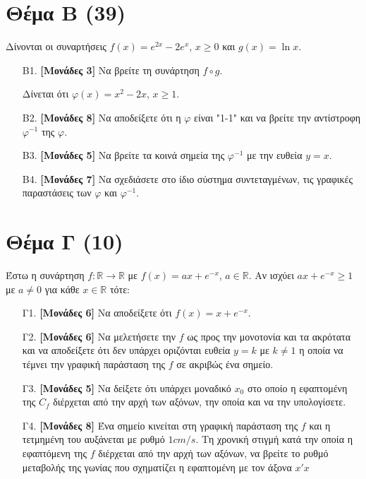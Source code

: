 \documentclass[14pt]{extarticle}
\begin{document}
\section*{Θέμα Β (39)}
Δίνονται οι συναρτήσεις $f(x)=e^{2x}-2e^{x}$, $x\ge 0$ και $g(x)=\ln x$.
\begin{enumerate}
 \item[Β1.] \textbf{[Μονάδες 3]} Να βρείτε τη συνάρτηση $f\circ g$.
       
       Δίνεται ότι $φ(x)=x^2-2x$, $x\ge 1$.
       
 \item[Β2.] \textbf{[Μονάδες 8]} Να αποδείξετε ότι η $φ$ είναι "1-1" και να βρείτε την αντίστροφη $φ^{-1}$ της $φ$.
 \item[Β3.] \textbf{[Μονάδες 5]} Να βρείτε τα κοινά σημεία της $φ^{-1}$ με την ευθεία $y=x$.
 \item[Β4.] \textbf{[Μονάδες 7]} Να σχεδιάσετε στο ίδιο σύστημα συντεταγμένων, τις γραφικές παραστάσεις των $φ$ και $φ^{-1}$.
\end{enumerate}

\section*{Θέμα Γ (10)}
Έστω η συνάρτηση $f:\mathbb{R}\to\mathbb{R}$ με $f(x)= ax+e^{-x}$, $a\in\mathbb{R}$. Αν ισχύει $ax+e^{-x}\ge 1$ με $a\ne 0$ για κάθε $x\in\mathbb{R}$ τότε:
\begin{enumerate}
 \item[Γ1.] \textbf{[Μονάδες 6]} Να αποδείξετε ότι $f(x)=x+e^{-x}$.
 \item[Γ2.] \textbf{[Μονάδες 6]} Να μελετήσετε την $f$ ως προς την μονοτονία και τα ακρότατα και να αποδείξετε ότι δεν υπάρχει οριζόνται ευθεία $y=k$ με $k\ne 1$ η οποία να τέμνει την γραφική παράσταση της $f$ σε ακριβώς ένα σημείο.
 \item[Γ3.] \textbf{[Μονάδες 5]} Να δείξετε ότι υπάρχει μοναδικό $x_0$ στο οποίο η εφαπτομένη της $C_f$ διέρχεται από την αρχή των αξόνων, την οποία και να την υπολογίσετε.
 \item[Γ4.] \textbf{[Μονάδες 8]} Ένα σημείο κινείται στη γραφική παράσταση της $f$ και η τετμημένη του αυξάνεται με ρυθμό $1 cm/s$. Τη χρονική στιγμή κατά την οποία η εφαπτόμενη της $f$ διέρχεται από την αρχή των αξόνων, να βρείτε το ρυθμό μεταβολής της γωνίας που σχηματίζει η εφαπτομένη με τον άξονα $x'x$
\end{enumerate}
\end{document}
